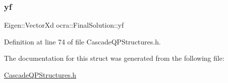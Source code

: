 \subsubsection{\texorpdfstring{yf}{yf}}
{\footnotesize\ttfamily Eigen\+::\+Vector\+Xd ocra\+::\+Final\+Solution\+::yf}



Definition at line 74 of file Cascade\+Q\+P\+Structures.\+h.



The documentation for this struct was generated from the following file\+:\begin{DoxyCompactItemize}
\item 
\hyperlink{CascadeQPStructures_8h}{Cascade\+Q\+P\+Structures.\+h}\end{DoxyCompactItemize}
